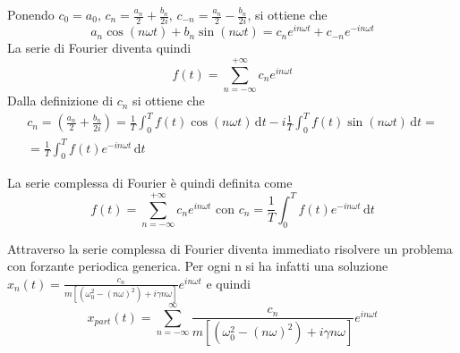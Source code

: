 Ponendo \(c_0 = a_0 \text{, } c_n = \frac{a_n}{2} + \frac{b_n}{2i} \text{, } c_{-n} = \frac{a_n}{2} - \frac{b_n}{2i}  \), si ottiene che
\[
	a_n \cos (n \omega t) + b_n \sin (n \omega t) = c_n e^{in \omega t} + c_{-n} e^{-in \omega t}
\]
La serie di Fourier diventa quindi
\[
	f(t) = \sum_{n=-\infty}^{+\infty} c_n e^{in \omega t}
\]
Dalla definizione di \(c_n\) si ottiene che
\begin{gather*}
	c_n = \left(\frac{a_n}{2}+\frac{b_n}{2i}\right) = \frac{1}{T} \int_{0}^{T} f(t) \cos (n \omega t) \,\mathrm{d}t - i \frac{1}{T} \int_{0}^{T} f(t) \sin (n \omega t) \,\mathrm{d}t =\\
	= \frac{1}{T} \int_{0}^{T} f(t) e^{-in \omega t} \,\mathrm{d}t 
\end{gather*}

\begin{definition}
	La serie complessa di Fourier è quindi definita come 
	\[
		f(t) = \sum_{n=-\infty}^{+\infty} c_n e^{in \omega t} \text{ con } c_n = \frac{1}{T} \int_{0}^{T} f(t) e^{-in \omega t} \,\mathrm{d}t 
	\]
\end{definition}
Attraverso la serie complessa di Fourier diventa immediato risolvere un problema con forzante periodica generica. Per ogni n si ha infatti una soluzione \(x_n(t)=\frac{c_n}{m [(\omega _0 ^{2} - (n \omega )^{2} )+i \gamma n \omega ]}e^{in \omega t} \) e quindi
\[
	x_{part}(t)=\sum_{n=-\infty }^{\infty} \frac{c_n}{m [(\omega _0 ^{2} - (n \omega )^{2} )+i \gamma n \omega ]}e^{in \omega t}
\]